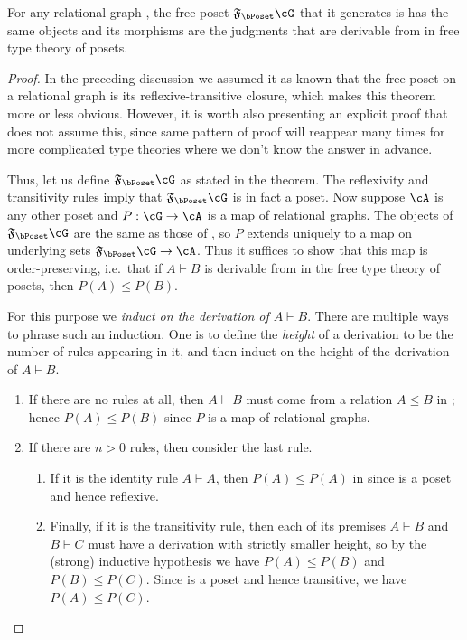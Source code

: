 \documentclass{book}
\let\types\vdash
\newcommand{\F}[1]{\mathfrak{F}_{#1}}
\begin{document}
\begin{thm}\label{thm:poset-initial-1}
  For any relational graph \cG, the free poset $\F{\bPoset}\cG$ that it generates is has the same objects and its morphisms are the judgments that are derivable from \cG in free type theory of posets.
\end{thm}
\begin{proof}
  In the preceding discussion we assumed it as known that the free poset on a relational graph is its reflexive-transitive closure, which makes this theorem more or less obvious.
  However, it is worth also presenting an explicit proof that does not assume this, since same pattern of proof will reappear many times for more complicated type theories where we don't know the answer in advance.

  Thus, let us define $\F{\bPoset}\cG$ as stated in the theorem.
  The reflexivity and transitivity rules imply that $\F{\bPoset}\cG$ is in fact a poset.
  Now suppose $\cA$ is any other poset and $P:\cG\to\cA$ is a map of relational graphs.
  The objects of $\F{\bPoset}\cG$ are the same as those of \cG, so $P$ extends uniquely to a map on underlying sets $\F{\bPoset}\cG\to\cA$.
  Thus it suffices to show that this map is order-preserving, i.e.\ that if $A\types B$ is derivable from \cG in the free type theory of posets, then $P(A)\le P(B)$.

  For this purpose we \emph{induct on the derivation of $A\types B$}.
  There are multiple ways to phrase such an induction.
  One is to define the \emph{height} of a derivation to be the number of rules appearing in it, and then induct on the height of the derivation of $A\types B$.
  \begin{enumerate}
  \item If there are no rules at all, then $A\types B$ must come from a relation $A\le B$ in \cG; hence $P(A)\le P(B)$ since $P$ is a map of relational graphs.
  \item If there are $n>0$ rules, then consider the last rule.
    \begin{enumerate}
    \item If it is the identity rule $A\types A$, then $P(A)\le P(A)$ in \cA since \cA is a poset and hence reflexive.
    \item Finally, if it is the transitivity rule, then each of its premises $A\types B$ and $B\types C$ must have a derivation with strictly smaller height, so by the (strong) inductive hypothesis we have $P(A)\le P(B)$ and $P(B)\le P(C)$.
      Since \cA is a poset and hence transitive, we have $P(A)\le P(C)$.\qedhere
    \end{enumerate}
  \end{enumerate}
\end{proof}
\end{document}
